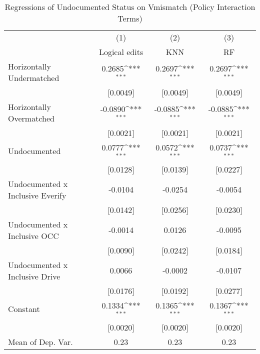 \begin{table}[htbp]\centering
\def\sym#1{\ifmmode^{#1}\else\(^{#1}\)\fi}
\caption{Regressions of Undocumented Status on Vmismatch (Policy Interaction Terms)}
\begin{tabular}{l*{3}{c}}
\toprule
                    &\multicolumn{1}{c}{(1)}         &\multicolumn{1}{c}{(2)}         &\multicolumn{1}{c}{(3)}         \\
                    &Logical edits         &         KNN         &          RF         \\
\midrule
Horizontally Undermatched&      0.2685\sym{***}&      0.2697\sym{***}&      0.2697\sym{***}\\
                    &    [0.0049]         &    [0.0049]         &    [0.0049]         \\
\addlinespace
Horizontally Overmatched&     -0.0890\sym{***}&     -0.0885\sym{***}&     -0.0885\sym{***}\\
                    &    [0.0021]         &    [0.0021]         &    [0.0021]         \\
\addlinespace
Undocumented        &      0.0777\sym{***}&      0.0572\sym{***}&      0.0737\sym{***}\\
                    &    [0.0128]         &    [0.0139]         &    [0.0227]         \\
\addlinespace
Undocumented x Inclusive Everify&     -0.0104         &     -0.0254         &     -0.0054         \\
                    &    [0.0142]         &    [0.0256]         &    [0.0230]         \\
\addlinespace
Undocumented x Inclusive OCC&     -0.0014         &      0.0126         &     -0.0095         \\
                    &    [0.0090]         &    [0.0242]         &    [0.0184]         \\
\addlinespace
Undocumented x Inclusive Drive&      0.0066         &     -0.0002         &     -0.0107         \\
                    &    [0.0176]         &    [0.0192]         &    [0.0277]         \\
\addlinespace
Constant            &      0.1334\sym{***}&      0.1365\sym{***}&      0.1367\sym{***}\\
                    &    [0.0020]         &    [0.0020]         &    [0.0020]         \\
\midrule
Mean of Dep. Var.   &        0.23         &        0.23         &        0.23         \\

\end{tabular}
\end{table}
